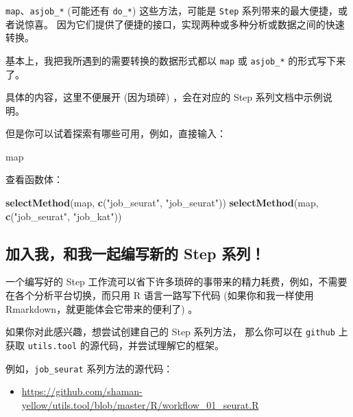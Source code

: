 \documentclass[
]{article}
\newenvironment{Shaded}{\begin{snugshade}}{\end{snugshade}}
\newcommand{\KeywordTok}[1]{\textcolor[rgb]{0.13,0.29,0.53}{\textbf{#1}}}
\newcommand{\NormalTok}[1]{#1}
\newcommand{\StringTok}[1]{\textcolor[rgb]{0.31,0.60,0.02}{#1}}
\providecommand{\tightlist}{%
  \setlength{\itemsep}{0pt}\setlength{\parskip}{0pt}}
\begin{document}
\texttt{map}、\texttt{asjob\_*} (可能还有 \texttt{do\_*}) 这些方法，可能是 \texttt{Step} 系列带来的最大便捷，或者说惊喜。
因为它们提供了便捷的接口，实现两种或多种分析或数据之间的快速转换。

基本上，我把我所遇到的需要转换的数据形式都以 \texttt{map} 或 \texttt{asjob\_*} 的形式写下来了。

具体的内容，这里不便展开 (因为琐碎) ，会在对应的 Step 系列文档中示例说明。

但是你可以试着探索有哪些可用，例如，直接输入：

\begin{Shaded}
\begin{Highlighting}[]
\NormalTok{map}
\end{Highlighting}
\end{Shaded}

查看函数体：

\begin{Shaded}
\begin{Highlighting}[]
\KeywordTok{selectMethod}\NormalTok{(map, }\KeywordTok{c}\NormalTok{(}\StringTok{"job\_seurat"}\NormalTok{, }\StringTok{"job\_seurat"}\NormalTok{))}
\KeywordTok{selectMethod}\NormalTok{(map, }\KeywordTok{c}\NormalTok{(}\StringTok{"job\_seurat"}\NormalTok{, }\StringTok{"job\_kat"}\NormalTok{))}
\end{Highlighting}
\end{Shaded}

\hypertarget{ux52a0ux5165ux6211ux548cux6211ux4e00ux8d77ux7f16ux5199ux65b0ux7684-step-ux7cfbux5217}{%
\subsection{加入我，和我一起编写新的 Step 系列！}\label{ux52a0ux5165ux6211ux548cux6211ux4e00ux8d77ux7f16ux5199ux65b0ux7684-step-ux7cfbux5217}}

一个编写好的 Step 工作流可以省下许多琐碎的事带来的精力耗费，例如，不需要在各个分析平台切换，而只用
R 语言一路写下代码 (如果你和我一样使用 Rmarkdown，就更能体会它带来的便利了) 。

如果你对此感兴趣，想尝试创建自己的 Step 系列方法，
那么你可以在 \texttt{github} 上获取 \texttt{utils.tool} 的源代码，并尝试理解它的框架。

例如，\texttt{job\_seurat} 系列方法的源代码：

\begin{itemize}
\tightlist
\item
  \url{https://github.com/shaman-yellow/utils.tool/blob/master/R/workflow_01_seurat.R}
\end{itemize}
\end{document}
